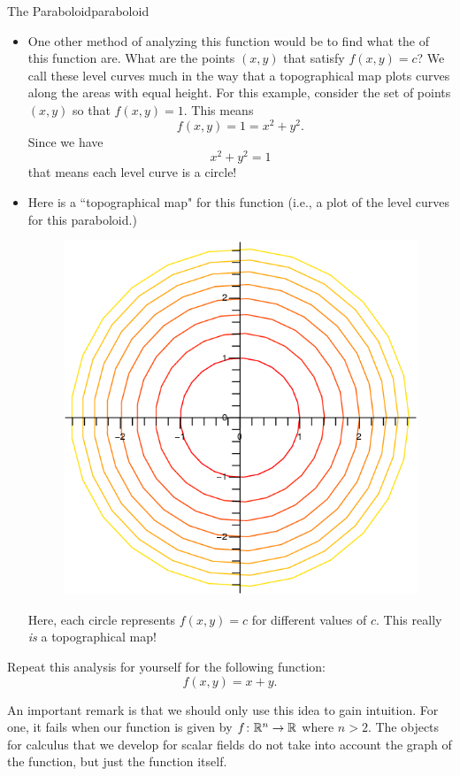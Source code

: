 \begin{ex}{The Paraboloid}{paraboloid}
\begin{itemize}
	                \item One other method of analyzing this function would be to find what the  of this function are.  What are the points $(x,y)$ that satisfy $f(x,y)=c$?  We call these level curves much in the way that a topographical map plots curves along the areas with equal height.  For this example, consider the set of points $(x,y)$ so that $f(x,y)=1.$ This means
                \[
                f(x,y)=1=x^2+y^2.
                \]
                Since we have
                \[
                x^2+y^2=1
                \]
                that means each level curve is a circle!
                \item Here is a ``topographical map" for this function (i.e., a plot of the level curves for this paraboloid.)
                \begin{figure}[H]
                    \centering
                    \includegraphics[width=.4\textwidth]{Figures_Part_6/parabolic_level_curves.png}
                \end{figure}
                Here, each circle represents $f(x,y)=c$ for different values of $c$.  This really \emph{is} a topographical map!
                \end{itemize}
                \end{ex}
                
                \begin{exercise}[Plane]
                Repeat this analysis for yourself for the following function:
                \[
                f(x,y)=x+y.
                \]
                \end{exercise}
                
                An important remark is that we should only use this idea to gain intuition. For one, it fails when our function is given by $f\colon \mathbb{R}^n \to \mathbb{R}$ where $n>2$.  The objects for calculus that we develop for scalar fields do not take into account the graph of the function, but just the function itself.  
                
